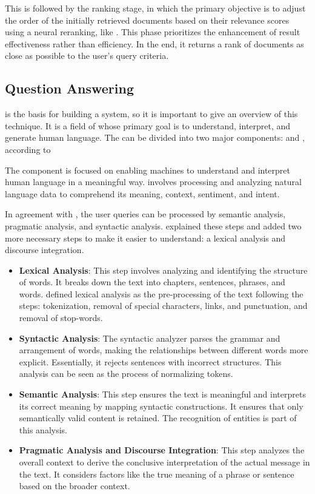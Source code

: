 This is followed by the ranking stage, in which the primary objective is to adjust the order of the initially retrieved documents based on their relevance scores using a neural reranking, like {\bert} \cite{chen_integrating_2023}. This phase prioritizes the enhancement of result effectiveness rather than efficiency. In the end, it returns a rank of documents as close as possible to the user's query criteria. 


\subsection{Question Answering}

{\nlp} is the basis for building a {\qa} system, so it is important to give an overview of this technique. It is a field of {\ai} whose primary goal is to understand, interpret, and generate human language. The {\nlp} can be divided into two major components: {\nlu} and {\nlg}, according to \citet{ayanouz_smart_2020}

The \textbf{ {\nlu} } component is focused on enabling machines to understand and interpret human language in a meaningful way. {\nlu} involves processing and analyzing natural language data to comprehend its meaning, context, sentiment, and intent. 

In agreement with \citet{ngai_intelligent_2021}, the user queries can be processed by semantic analysis, pragmatic analysis, and syntactic analysis. \citet{ayanouz_smart_2020} explained these steps and added two more necessary steps to make it easier to understand: a lexical analysis and discourse integration.

\begin{itemize}
    \item \textbf{Lexical Analysis}: This step involves analyzing and identifying the structure of words. It breaks down the text into chapters, sentences, phrases, and words. \citet{chizhik_challenges_2020} defined lexical analysis as the pre-processing of the text following the steps: tokenization, removal of special characters, links, and punctuation, and removal of stop-words.

    \item \textbf{Syntactic Analysis}: The syntactic analyzer parses the grammar and arrangement of words, making the relationships between different words more explicit. Essentially, it rejects sentences with incorrect structures. This analysis can be seen as the process of normalizing tokens.

    \item \textbf{Semantic Analysis}: This step ensures the text is meaningful and interprets its correct meaning by mapping syntactic constructions. It ensures that only semantically valid content is retained. The recognition of entities is part of this analysis.

    \item \textbf{Pragmatic Analysis and Discourse Integration}: This step analyzes the overall context to derive the conclusive interpretation of the actual message in the text. It considers factors like the true meaning of a phrase or sentence based on the broader context.
\end{itemize}

